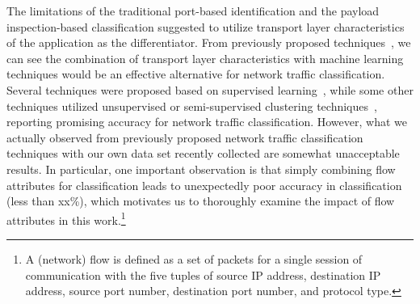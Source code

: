 \documentclass[conference]{IEEEtran}
\begin{document}
The limitations of the traditional port-based identification and the payload inspection-based classification suggested to utilize  transport layer characteristics of the application as the differentiator. From previously proposed techniques~\cite{}, we can see the combination of transport layer characteristics with machine learning techniques would be an effective alternative for network traffic classification. %
Several techniques were proposed based on supervised learning~\cite{}, while some other techniques utilized unsupervised or semi-supervised clustering techniques~\cite{}, reporting promising  accuracy for network traffic classification.
However, what we actually observed from previously proposed network traffic classification techniques with our own data set recently collected are somewhat unacceptable results. In particular, one important observation is that simply combining flow attributes for classification leads to unexpectedly poor accuracy in classification (less than xx\%), which motivates us to thoroughly examine the impact of flow attributes in this work.\footnote{A (network) flow is defined as a set of packets for a single session of communication with the five tuples of source IP address, destination IP address, source port number, destination port number, and protocol type.}

\end{document}
